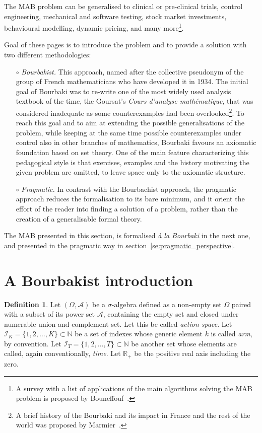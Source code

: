 \documentclass[]{scrartcl}
\theoremstyle{definition}
\newtheorem{definition}{Definition}[section]
\begin{document}
The MAB problem can be generalised to clinical or pre-clinical trials, control engineering, mechanical and software testing, stock market investments, behavioural modelling, dynamic pricing, and many more\footnote{A survey with a list of applications of the main algorithms solving the MAB problem is proposed by Bouneffouf~\cite{bf2019survey}.}.

Goal of these pages is to introduce the problem and to provide a solution with two different methodologies:
\begin{itemize}
    \item[$\circ$] \emph{Bourbakist.} This approach, named after the collective pseudonym of the group of French mathematicians who have developed it in 1934. The initial goal of Bourbaki was to re-write one of the most widely used analysis textbook of the time, the Goursat’s \emph{Cours d'analyse mathématique}, that was considered inadequate as some counterexamples had been overlooked\footnote{A brief history of the Bourbaki and its impact in France and the rest of the world was proposed by Marmier~\cite{marmier2014idea}.}. To reach this goal and to aim at extending the possible generalisations of the problem, while keeping at the same time possible counterexamples under control also in other branches of mathematics, Bourbaki favours an axiomatic foundation based on set theory. One of the main feature characterizing this pedagogical style is that exercises, examples and the history motivating the given problem are omitted, to leave space only to the axiomatic structure.
    \item[$\circ$] \emph{Pragmatic.} In contrast with the Bourbachist approach, the pragmatic approach reduces the formalisation to its bare minimum, and it orient the effort of the reader into finding a solution of a problem, rather than the creation of a generalisable formal theory.
\end{itemize}
The MAB presented in this section, is formalised \emph{à la Bourbaki} in the next one, and presented in the pragmatic way in section~\ref{se:pragmatic_perspective}.


\section{A Bourbakist introduction}
\label{se:bourbaki_perspective}

\begin{definition}
    Let $(\Omega, \mathcal{A})$ be a $\sigma$-algebra defined as a non-empty set $\Omega$ paired with a subset of its power set $\mathcal{A}$, containing the empty set and closed under numerable union and complement set. Let this be called \emph{action space}. Let $\mathcal{I}_{K} = \{1,2, \dots , K\} \subset \mathbb{N}$ be a set of indexes whose generic element $k$ is called \emph{arm}, by convention. Let $\mathcal{I}_{T} = \{1,2, \dots , T\} \subset \mathbb{N}$ be another set whose elements are called, again conventionally, \emph{time}. Let $\mathbb{R}_{+}$ be the positive real axis including the zero.
\end{definition}
\end{document}
